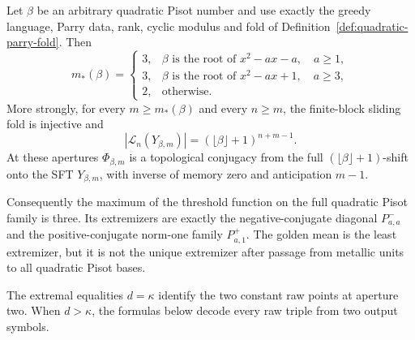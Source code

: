 \begin{theorem}
\label{thm:full-quadratic-pisot-threshold}
Let $\beta$ be an arbitrary quadratic Pisot number and use exactly the
greedy language, Parry data, rank, cyclic modulus and fold of
Definition~\ref{def:quadratic-parry-fold}.  Then
\[
m_*(\beta)=
\begin{cases}
3,&\beta\text{ is the root of }x^2-ax-a,\quad a\ge1,\\
3,&\beta\text{ is the root of }x^2-ax+1,\quad a\ge3,\\
2,&\text{otherwise}.
\end{cases}
\]
More strongly, for every $m\ge m_*(\beta)$ and every $n\ge m$, the
finite-block sliding fold is injective and
\begin{equation}
|\mathcal L_n(Y_{\beta,m})|
=(\lfloor\beta\rfloor+1)^{n+m-1}.
\label{eq:quadratic-pisot-block-count}
\end{equation}
At these apertures $\Phi_{\beta,m}$ is a topological conjugacy from the full
$(\lfloor\beta\rfloor+1)$-shift onto the SFT $Y_{\beta,m}$, with inverse of
memory zero and anticipation $m-1$.

Consequently the maximum of the threshold function on the full quadratic
Pisot family is three.  Its extremizers are exactly the negative-conjugate
diagonal $P^-_{a,a}$ and the positive-conjugate norm-one family
$P^+_{a,1}$.  The golden mean is the least extremizer, but it is not the
unique extremizer after passage from metallic units to all quadratic Pisot
bases.
\end{theorem}

The extremal equalities $d=\kappa$ identify the two constant raw points at
aperture two.  When $d>\kappa$, the formulas below decode every raw triple
from two output symbols.

